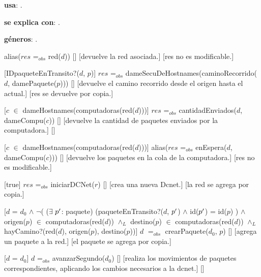 \begin{Interfaz}

  \textbf{usa}: .
  
  \textbf{se explica con}: .

  \textbf{g\'eneros}: .


  {alias($res$ =$_{obs}$ red($d$))}%
  []
  [devuelve la red asociada.]
  [res no es modificable.]

  [IDpaqueteEnTransito?($d$, $p$)]
  {$res$ =$_{obs}$ dameSecuDeHostnames(caminoRecorrido($d$, damePaquete($p$)))}%
  []
  [devuelve el camino recorrido desde el origen hasta el actual.]
  [res se devuelve por copia.]
  
  [$c$ $\in$ dameHostnames(computadoras(red($d$)))]
  {$res$ =$_{obs}$ cantidadEnviados($d$, dameCompu($c$))}%
  []
  [devuelve la cantidad de paquetes enviados por la computadora.]
  []

  [$c$ $\in$ dameHostnames(computadoras(red($d$)))]
  {alias($res$ =$_{obs}$ enEspera($d$, dameCompu($c$)))}%
  []
  [devuelve los paquetes en la cola de la computadora.]
  [res no es modificable.]
  
  [true]
  {$res$ =$_{obs}$ iniciarDCNet($r$)}%
  []
  [crea una nueva Dcnet.]
  [la red se agrega por copia.]
    
  [$d$ = $d_0$ $\wedge$ $\neg$( ($\exists$ $p\sp{\prime}$: paquete) (paqueteEnTransito?($d$, $p\sp{\prime}$) $\wedge$ id($p\sp{\prime}$) = id($p$) ) $\wedge$ \newline
  origen($p$) $\in$ computadoras(red($d$)) $\wedge_L$ destino($p$) $\in$ computadoras(red($d$)) $\wedge_L$ hayCamino?(red($d$), origen($p$), destino($p$))]
  {$d$ $=_{obs}$ crearPaquete($d_0$, $p$)}%
  []
  [agrega un paquete a la red.]
  [el paquete se agrega por copia.]

  [$d$ = $d_0$]
  {$d$ =$_{obs}$ avanzarSegundo($d_0$)}%
  []
  [realiza los movimientos de paquetes correspondientes, aplicando los cambios necesarios a la dcnet.]
  []
  

\end{Interfaz}
